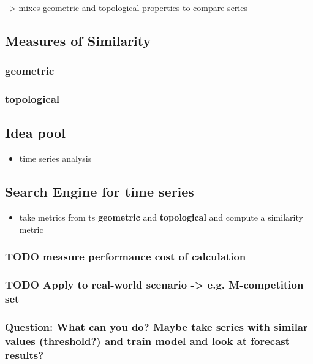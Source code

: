 \documentclass[11pt]{article}
\begin{document}
\cite{Zhang_2021} --> mixes geometric and topological properties to compare series



\subsection{Measures of Similarity}
\label{sec:org39b19b3}
\subsubsection{geometric}
\label{sec:orgb3fb82f}
\subsubsection{topological}
\label{sec:org7193a70}

\subsection{Idea pool}
\label{sec:orgd04c8c7}
\begin{itemize}
\item time series analysis
\end{itemize}

\subsection{Search Engine for time series}
\label{sec:org7b5fa7c}
\begin{itemize}
\item take metrics from ts \textbf{geometric} and \textbf{topological} and compute a similarity metric
\end{itemize}
\subsubsection{{\bfseries\sffamily TODO} measure performance cost of calculation}
\label{sec:orgeb49859}
\subsubsection{{\bfseries\sffamily TODO} Apply to real-world scenario -> e.g. M-competition set}
\label{sec:orgd1f88cc}
\subsubsection{Question: What can you do? Maybe take series with similar values (threshold?) and train model and look at forecast results?}
\label{sec:org5e1ba5e}
\end{document}
